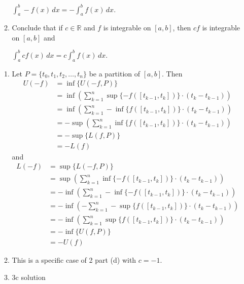 \documentclass[11pt]{exam}
\newcommand{\sntk}{\sum_{k=1}^{n}}
\begin{document}
\begin{enumerate}
\begin{enumerate}
                \( \int_{a}^{b} -f(x) \,dx = -\int_{a}^{b} f(x) \,dx \).
                \item Conclude that if \( c \in \mathbb{R} \) and \( f \) is integrable on \( [a, b] \), then \( cf \) is integrable on \( [a, b] \) and
    
                \( \int_{a}^{b} cf(x) \,dx = c \int_{a}^{b} f(x) \,dx \).
            \end{enumerate}
                \begin{solution}
                    \begin{enumerate}
                        \item Let $P = \{t_0, t_1, t_2, \ldots , t_n\}$ be a partition of $[a, b]$. Then 
                            \begin{align*}
                                U(-f) &= \inf\{U(-f, P)\} \\
                                    &= \inf\left(\sntk \sup\{-f([t_{k-1}, t_k])\} \cdot (t_k - t_{k-1})\right) \\
                                    &= \inf\left(\sntk -\inf\{f([t_{k-1}, t_k])\} \cdot (t_k - t_{k-1})\right) \\
                                    &= -\sup\left(\sntk \inf\{f([t_{k-1}, t_k])\} \cdot (t_k - t_{k-1})\right) \\
                                    &= -\sup\{L(f, P)\}  \\
                                    &= -L(f)
                            \end{align*}
                            and 
                            \begin{align*}
                                L(-f) &= \sup\{L(-f, P)\} \\
                                    &= \sup\left(\sntk \inf\{-f([t_{k-1}, t_k])\} \cdot (t_k - t_{k-1})\right) \\
                                    &= -\inf\left(\sntk -\inf\{-f([t_{k-1}, t_k])\} \cdot (t_k - t_{k-1})\right) \\
                                    &= -\inf\left(-\sntk -\sup\{f([t_{k-1}, t_k])\} \cdot (t_k - t_{k-1})\right) \\
                                    &= -\inf\left(\sntk \sup\{f([t_{k-1}, t_k])\} \cdot (t_k - t_{k-1})\right) \\
                                    &= -\inf\{U(f, P)\}  \\
                                    &= -U(f)
                            \end{align*}
                        \item This is a specific case of 2 part (d) with $c = -1$.
                        \item 3c solution
                    \end{enumerate}
                \end{solution}
            \end{enumerate}
            
\end{document}
